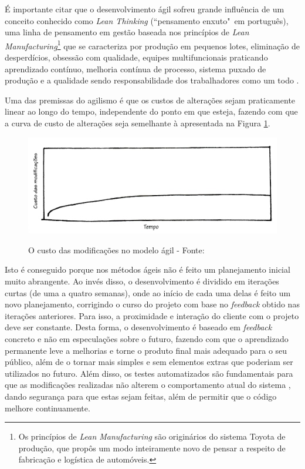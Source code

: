 É importante citar que o desenvolvimento ágil sofreu grande influência de um conceito conhecido como \textit{Lean Thinking} (``pensamento enxuto"\ em português), uma linha de pensamento em gestão baseada nos princípios de \textit{Lean Manufacturing}\footnote{Os princípios de \textit{Lean Manufacturing} são originários do sistema Toyota de produção, que propôs um modo inteiramente novo de pensar a respeito de fabricação e logística de automóveis.} que se caracteriza por produção em pequenos lotes, eliminação de desperdícios, obsessão com qualidade, equipes multifuncionais praticando aprendizado contínuo, melhoria contínua de processo, sistema puxado de produção e a qualidade sendo responsabilidade dos trabalhadores como um todo \cite{BDDRodrigo}.

Uma das premissas do agilismo é que os custos de alterações sejam praticamente linear ao longo do tempo, independente do ponto em que esteja, fazendo com que a curva de custo de alterações seja semelhante à apresentada na Figura \ref{img:custo-agile}.

\begin{figure}[h]
  \center
  \caption{O custo das modificações no modelo ágil - Fonte: \cite{XPKent}}
  \includegraphics[scale=0.45]{images/custo-agile}
  \label{img:custo-agile}
\end{figure}

Isto é conseguido porque nos métodos ágeis não é feito um planejamento inicial muito abrangente. Ao invés disso, o desenvolvimento é dividido em iterações curtas (de uma a quatro semanas), onde ao início de cada uma delas é feito um novo planejamento, corrigindo o curso do projeto com base no \textit{feedback} obtido nas iterações anteriores. Para isso, a proximidade e interação do cliente com o projeto deve ser constante. Desta forma, o desenvolvimento é baseado em \textit{feedback} concreto e não em especulações sobre o futuro, fazendo com que o aprendizado permanente leve a melhorias e torne o produto final mais adequado para o seu público, além de o tornar mais simples e sem elementos extras que poderiam ser utilizados no futuro. Além disso, os testes automatizados são fundamentais para que as modificações realizadas não alterem o comportamento atual do sistema  \cite{XPKent}, dando segurança para que estas sejam feitas, além de permitir que o código melhore continuamente.

